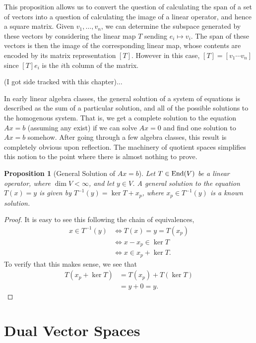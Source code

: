 \documentclass[12pt]{article}
\theoremstyle{definition}
\theoremstyle{plain}
\newtheorem{proposition}[theorem] {Proposition}
\numberwithin{equation}{section}
\theoremstyle{definition}
\begin{document}
This proposition allows us to convert the question of calculating the span of a set of vectors into a question of calculating the image of a linear operator, and hence a square matrix. Given $ v_1, \ldots, v_n $, we can determine the subspace generated by these vectors by considering the linear map $ T $ sending $ e_i \mapsto v_i $. The span of these vectors is then the image of the corresponding linear map, whose contents are encoded by its matrix representation $ [T] $. However in this case, $ [T] = [v_1 \cdots v_n]$ since $ [T]e_i$ is the $ i $th column of the matrix.

(I got side tracked with this chapter)...

In early linear algebra classes, the general solution of a system of equations is described as the sum of a particular solution, and all of the possible solutions to the homogenous system. That is, we get a complete solution to the equation $ Ax = b $ (assuming any exist) if we can solve $ Ax = 0 $ and find one solution to $ Ax = b $ somehow. After going through a few algebra classes, this result is completely obvious upon reflection. The machinery of quotient spaces simplifies this notion to the point where there is almost nothing to prove.

\begin{proposition}[General Solution of $ Ax = b $]
Let $ T \in \operatorname{End}(V) $ be a linear operator, where $ \dim V < \infty $, and let $ y \in V $. A general solution to the equation $ T(x) = y $ is given by $ T^{-1}(y) = \ker T + x_p$, where $ x_p \in T^{-1}(y) $ is a known solution.
\end{proposition}

\begin{proof}
It is easy to see this following the chain of equivalences,
\begin{align*}
	x \in T^{-1}(y) &\iff T(x) = y = T(x_p)\\
	&\iff x - x_p \in \ker T\\
	&\iff x \in x_p + \ker T.
\end{align*}
To verify that this makes sense, we see that 
\begin{align*}
	T(x_p + \ker T) &= T(x_p) + T (\ker T)\\
	&= y + 0 = y.
\end{align*}
\end{proof}

\section{Dual Vector Spaces}
\end{document}

